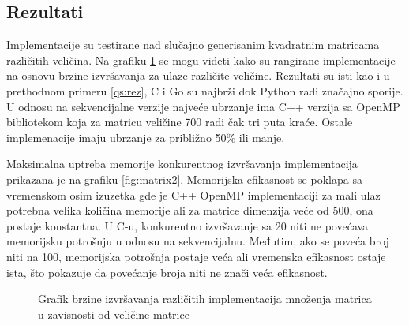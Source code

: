 \documentclass[12pt,oneside]{memoir}
\begin{document}
\subsection{Rezultati}
Implementacije su testirane nad slučajno generisanim kvadratnim matricama različitih veličina. Na grafiku \ref{fig:matrix} se mogu videti kako su rangirane implementacije na osnovu brzine izvršavanja za ulaze različite veličine. Rezultati su isti kao i u prethodnom primeru \ref{qs:rez}, C i Go su najbrži dok Python radi značajno sporije.  U odnosu na sekvencijalne verzije najveće ubrzanje ima C++ verzija sa OpenMP bibliotekom koja za matricu veličine 700 radi čak tri puta kraće. Ostale implemenacije imaju ubrzanje za približno 50\% ili manje.

Maksimalna uptreba memorije konkurentnog izvršavanja implementacija prikazana je na grafiku \ref{fig:matrix2}. Memorijska efikasnost se poklapa sa vremenskom osim izuzetka gde je C++ OpenMP implementaciji za mali ulaz potrebna velika količina memorije ali za matrice dimenzija veće od 500, ona postaje konstantna. U C-u, konkurentno izvršavanje sa 20 niti ne povećava memorijsku potrošnju u odnosu na sekvencijalnu. Međutim, ako se poveća broj niti na 100, memorijska potrošnja postaje veća ali vremenska efikasnost ostaje ista, što pokazuje da povećanje broja niti ne znači veća efikasnost.

\begin{figure}
\begin{center}


\caption{Grafik brzine izvršavanja različitih implementacija množenja matrica u zavisnosti od veličine matrice}
\label{fig:matrix}
\end{center}
\end{figure}
\end{document}
